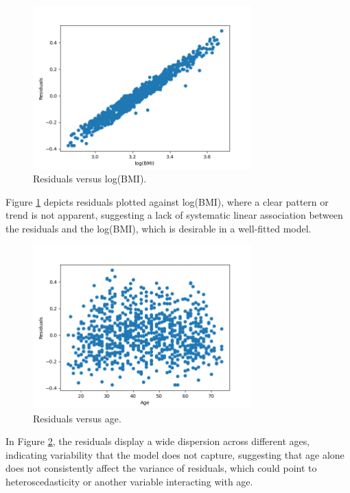 \documentclass{rapport}
\begin{document}
\begin{figure}[H]
    \centering
    \includegraphics[width=0.75\textwidth]{residuals_vs_log_bmi.png}
    \caption{\small Residuals versus log(BMI).}
    \label{fig:residuals_log_bmi}
\end{figure}

\noindent
Figure \ref{fig:residuals_log_bmi} depicts residuals plotted against log(BMI), where a clear pattern or trend is not apparent, suggesting a lack of systematic linear association between the residuals and the log(BMI), which is desirable in a well-fitted model.

\begin{figure}[H]
    \centering
    \includegraphics[width=0.75\textwidth]{residuals_vs_age.png}
    \caption{\small Residuals versus age.}
    \label{fig:residuals_age}
\end{figure}

\noindent
In Figure \ref{fig:residuals_age}, the residuals display a wide dispersion across different ages, indicating variability that the model does not capture, suggesting that age alone does not consistently affect the variance of residuals, which could point to heteroscedasticity or another variable interacting with age.
\end{document}
